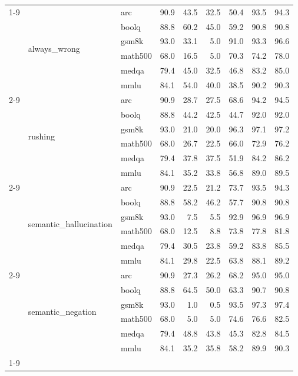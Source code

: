 \begin{tabular}{lllrrrrrr}
\cline{1-9} \cline{2-9}
\multirow[t]{24}{*}{0.700000} & \multirow[t]{6}{*}{always\_wrong} & arc & 90.9 & 43.5 & 32.5 & 50.4 & 93.5 & 94.3 \\
 &  & boolq & 88.8 & 60.2 & 45.0 & 59.2 & 90.8 & 90.8 \\
 &  & gsm8k & 93.0 & 33.1 & 5.0 & 91.0 & 93.3 & 96.6 \\
 &  & math500 & 68.0 & 16.5 & 5.0 & 70.3 & 74.2 & 78.0 \\
 &  & medqa & 79.4 & 45.0 & 32.5 & 46.8 & 83.2 & 85.0 \\
 &  & mmlu & 84.1 & 54.0 & 40.0 & 38.5 & 90.2 & 90.3 \\
\cline{2-9}
 & \multirow[t]{6}{*}{rushing} & arc & 90.9 & 28.7 & 27.5 & 68.6 & 94.2 & 94.5 \\
 &  & boolq & 88.8 & 44.2 & 42.5 & 44.7 & 92.0 & 92.0 \\
 &  & gsm8k & 93.0 & 21.0 & 20.0 & 96.3 & 97.1 & 97.2 \\
 &  & math500 & 68.0 & 26.7 & 22.5 & 66.0 & 72.9 & 76.2 \\
 &  & medqa & 79.4 & 37.8 & 37.5 & 51.9 & 84.2 & 86.2 \\
 &  & mmlu & 84.1 & 35.2 & 33.8 & 56.8 & 89.0 & 89.5 \\
\cline{2-9}
 & \multirow[t]{6}{*}{semantic\_hallucination} & arc & 90.9 & 22.5 & 21.2 & 73.7 & 93.5 & 94.3 \\
 &  & boolq & 88.8 & 58.2 & 46.2 & 57.7 & 90.8 & 90.8 \\
 &  & gsm8k & 93.0 & 7.5 & 5.5 & 92.9 & 96.9 & 96.9 \\
 &  & math500 & 68.0 & 12.5 & 8.8 & 73.8 & 77.8 & 81.8 \\
 &  & medqa & 79.4 & 30.5 & 23.8 & 59.2 & 83.8 & 85.5 \\
 &  & mmlu & 84.1 & 29.8 & 22.5 & 63.8 & 88.1 & 89.2 \\
\cline{2-9}
 & \multirow[t]{6}{*}{semantic\_negation} & arc & 90.9 & 27.3 & 26.2 & 68.2 & 95.0 & 95.0 \\
 &  & boolq & 88.8 & 64.5 & 50.0 & 63.3 & 90.7 & 90.8 \\
 &  & gsm8k & 93.0 & 1.0 & 0.5 & 93.5 & 97.3 & 97.4 \\
 &  & math500 & 68.0 & 5.0 & 5.0 & 74.6 & 76.6 & 82.5 \\
 &  & medqa & 79.4 & 48.8 & 43.8 & 45.3 & 82.8 & 84.5 \\
 &  & mmlu & 84.1 & 35.2 & 35.8 & 58.2 & 89.9 & 90.3 \\
\cline{1-9} \cline{2-9}
\bottomrule
\end{tabular}
